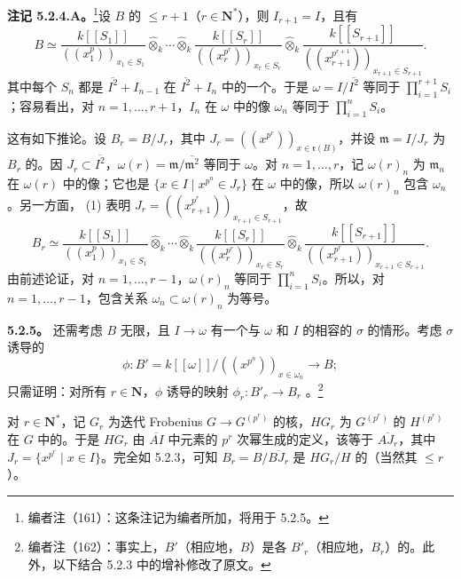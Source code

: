 \textbf{注记 5.2.4.A。}\footnote{编者注（161）：这条注记为编者所加，将用于 5.2.5。}设 $B$ 的 $\leq r+1$（$r\in\mathbf N^*$），则 $I_{r+1}=I$，且有
\[
B\simeq
\frac{k[[S_1]]}{((x_1^p))_{x_1\in S_1}}\widehat\otimes_k\cdots\widehat\otimes_k
\frac{k[[S_r]]}{((x_r^{p^r}))_{x_r\in S_r}}\widehat\otimes_k
\frac{k[[S_{r+1}]]}{((x_{r+1}^{p^{r+1}}))_{x_{r+1}\in S_{r+1}}}.\tag{1}
\]
其中每个 $S_n$ 都是 $\overline{I^2}+I_{n-1}$ 在 $\overline{I^2}+I_n$ 中的一个。于是 $\omega=I/\overline{I^2}$ 等同于 $\prod_{i=1}^{r+1}S_i$；容易看出，对 $n=1,\ldots,r+1$，$I_n$ 在 $\omega$ 中的像 $\omega_n$ 等同于 $\prod_{i=1}^nS_i$。

这有如下推论。设 $B_r=B/J_r$，其中 $J_r=((x^{p^r}))_{x\in\mathfrak r(B)}$，并设 $\mathfrak m=I/J_r$ 为 $B_r$ 的。因 $J_r\subset\overline{I^2}$，$\omega(r)=\mathfrak m/\overline{\mathfrak m^2}$ 等同于 $\omega$。对 $n=1,\ldots,r$，记 $\omega(r)_n$ 为 $\mathfrak m_n$ 在 $\omega(r)$ 中的像；它也是 $\{x\in I\mid x^{p^n}\in J_r\}$ 在 $\omega$ 中的像，所以 $\omega(r)_n$ 包含 $\omega_n$。另一方面， (1) 表明 $J_r=((x_{r+1}^{p^r}))_{x_{r+1}\in S_{r+1}}$，故
\[
B_r\simeq
\frac{k[[S_1]]}{((x_1^p))_{x_1\in S_1}}\widehat\otimes_k\cdots\widehat\otimes_k
\frac{k[[S_r]]}{((x_r^{p^r}))_{x_r\in S_r}}\widehat\otimes_k
\frac{k[[S_{r+1}]]}{((x_{r+1}^{p^r}))_{x_{r+1}\in S_{r+1}}}.\tag{2}
\]
由前述论证，对 $n=1,\ldots,r-1$，$\omega(r)_n$ 等同于 $\prod_{i=1}^nS_i$。所以，对 $n=1,\ldots,r-1$，包含关系 $\omega_n\subset\omega(r)_n$ 为等号。

\textbf{5.2.5。} 还需考虑 $B$ 无限，且 $I\to\omega$ 有一个与 $\omega$ 和 $I$ 的相容的 $\sigma$ 的情形。考虑 $\sigma$ 诱导的
\[\phi:B'=k[[\omega]]/((x^{p^n}))_{x\in\omega_n}\longrightarrow B;\]
只需证明：对所有 $r\in\mathbf N$，$\phi$ 诱导的映射 $\phi_r:B'_r\to B_r$ 。\footnote{编者注（162）：事实上，$B'$（相应地，$B$）是各 $B'_r$（相应地，$B_r$）的。此外，以下结合 5.2.3 中的增补修改了原文。}

对 $r\in\mathbf N^*$，记 $G_r$ 为迭代 Frobenius  $G\to G^{(p^r)}$ 的核，$HG_r$ 为 $G^{(p^r)}$ 的 $H^{(p^r)}$ 在 $G$ 中的。于是 $HG_r$ 由 $\overline{AI}$ 中元素的 $p^r$ 次幂生成的定义，该等于 $\overline{AJ_r}$，其中 $J_r=\{x^{p^r}\mid x\in I\}$。完全如 5.2.3，可知 $B_r=B/\overline{BJ_r}$ 是 $HG_r/H$ 的（当然其 $\leq r$）。

